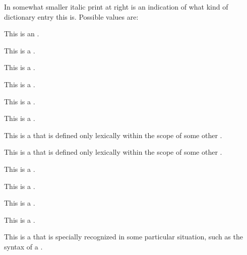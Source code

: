 In somewhat smaller italic print at right is an indication of what kind
of dictionary entry this is.  Possible values are:

\beginlist


This is an  .


This is a .


This is a .


This is a .


This is a .


This is a .


This is a  that is defined only lexically within the scope of some
other .


This is a  that is defined only lexically within the scope of some
other .


This is a .


This is a .


This is a .


This is a .


This is a  that is specially recognized in some particular situation,
such as the syntax of a .



